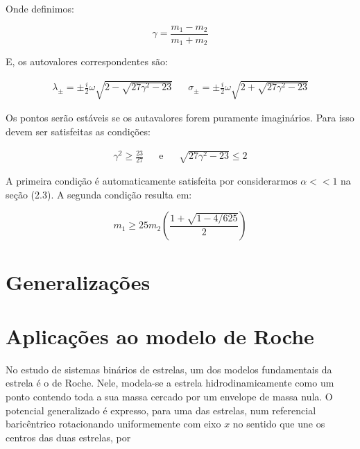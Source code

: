 Onde definimos: 

\vspace{-35px}

\begin{equation*}
\!\!\!\!\!\!\!\!\!\!\!\!\!\!\!\!\!\!\!\!\!\!\!\!\!\!\!\!\!\!\!\!\!\!\!\!\!\!\!\!\!\!\!\!\!\!\!\!\!\!\!\!\!\!\!\!\!\!\!\!\!\!\!\!\!\!\!\!\!\!\!\!\!\!\!\!\!\!\!\!\!\!\!\!\!\!\!\!\!\!\!\!\!\!\!\!\!\!\!\!\!\!\!\!\!\!\!\!\!\!\!\!\!\!\!\!\!\!\!\!\!\!\!\!\!\! \gamma = \dfrac{m_1-m_2}{m_1+m_2}
\end{equation*}

E, os autovalores correspondentes são:

\begin{align}
\lambda_{\pm} = \pm \frac{i}{2} \omega \sqrt{2-\sqrt{27\gamma^2-23}} && \sigma_{\pm} = \pm \frac{i}{2} \omega \sqrt{2 +\sqrt{27\gamma^2 - 23}}
\end{align}

Os pontos serão estáveis se os autavalores forem puramente imaginários. Para isso devem ser satisfeitas as condições:

\begin{align}
\gamma^2 \geq \frac{23}{27} && \text{e} && \sqrt{27\gamma^2 -23} \leq 2
\end{align}

A primeira condição é automaticamente satisfeita por considerarmos $\alpha << 1$ na seção (2.3). A segunda condição resulta em:

\begin{equation}
m_1 \geq 25m_2\left(\dfrac{1+\sqrt{1-4/625}}{2}\right)
\end{equation}

\section{Generalizações}



\section{Aplicações ao modelo de Roche}

No estudo de sistemas binários de estrelas, um dos modelos fundamentais da estrela é o de Roche. Nele, modela-se a estrela hidrodinamicamente como um ponto contendo toda a sua massa cercado por um envelope de massa nula. O potencial generalizado é expresso, para uma das estrelas, num referencial baricêntrico rotacionando uniformemente com eixo $x$ no sentido que une os centros das duas estrelas, por

